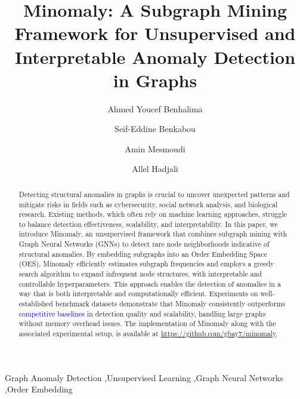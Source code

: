 \documentclass[preprint,12pt]{elsarticle}
\newcommand{\new}[1]{\textcolor{blue}{#1}}
\theoremstyle{plain}
\theoremstyle{definition}
\theoremstyle{remark}
\begin{document}
\begin{frontmatter}

\title{Minomaly: A Subgraph Mining Framework for Unsupervised and Interpretable Anomaly Detection in Graphs}

\author[ensma]{Ahmed Youcef Benhalima}
\author[poitiers]{Seif-Eddine Benkabou}
\author[poitiers]{Amin Mesmoudi}
\author[ensma]{Allel Hadjali}



\begin{abstract}
Detecting structural anomalies in graphs is crucial to uncover unexpected patterns and mitigate risks in fields such as cybersecurity, social network analysis, and biological research. Existing methods, which often rely on machine learning approaches, struggle to balance detection effectiveness, scalability, and interpretability.
In this paper, we introduce Minomaly, an unsupervised framework that combines subgraph mining with Graph Neural Networks (GNNs) to detect rare node neighborhoods indicative of structural anomalies. By embedding subgraphs into an Order Embedding Space (OES), Minomaly efficiently estimates subgraph frequencies and employs a greedy search algorithm to expand infrequent node structures, with interpretable and controllable hyperparameters. This approach enables the detection of anomalies in a way that is both interpretable and computationally efficient. Experiments on well-established benchmark datasets demonstrate that Minomaly consistently outperforms \new{competitive baselines} in detection quality and scalability, handling large graphs without memory overhead issues. The implementation of Minomaly along with the associated experimental setup, is available at \href{https://github.com/gbay7/minomaly}{https://github.com/gbay7/minomaly}.
\end{abstract}

\begin{keyword}
Graph Anomaly Detection \sep Unsupervised Learning \sep Graph Neural Networks \sep Order Embedding
\end{keyword}

\end{frontmatter}
\end{document}
